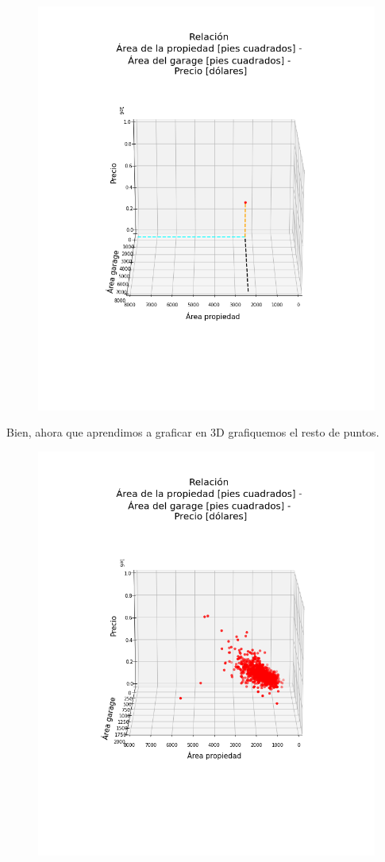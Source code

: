 \documentclass{article}
\begin{document}
\begin{figure}[h!]
\includegraphics[scale=0.5]{Imagenes/ubicacion_en_z.png}
\centering
\end{figure}
\newpage
Bien, ahora que aprendimos a graficar en 3D grafiquemos el resto de puntos.\\
\begin{figure}[h!]
\includegraphics[scale=0.5]{Imagenes/grafico_final.png}
\centering
\end{figure}
\end{document}
